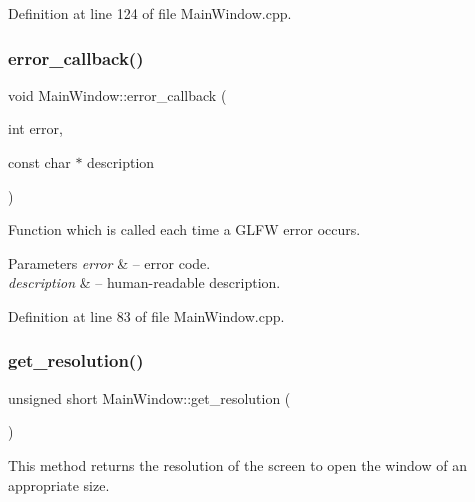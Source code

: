 Definition at line 124 of file Main\+Window.\+cpp.

\mbox{\label{class_main_window_a33c07a10c43688414df5cbf157f58a18}} 
\subsubsection{\texorpdfstring{error\+\_\+callback()}{error\_callback()}}
{\footnotesize\ttfamily void Main\+Window\+::error\+\_\+callback (\begin{DoxyParamCaption}\item[{int}]{error,  }\item[{const char $\ast$}]{description }\end{DoxyParamCaption})\hspace{0.3cm}{\ttfamily [static]}}



Function which is called each time a G\+L\+FW error occurs. 


\begin{DoxyParams}{Parameters}
{\em error} & -- error code. \\
\hline
{\em description} & -- human-\/readable description. \\
\hline
\end{DoxyParams}


Definition at line 83 of file Main\+Window.\+cpp.

\mbox{\label{class_main_window_afb697f0b20242dc01f9c8779382ae53b}} 
\subsubsection{\texorpdfstring{get\+\_\+resolution()}{get\_resolution()}}
{\footnotesize\ttfamily unsigned short Main\+Window\+::get\+\_\+resolution (\begin{DoxyParamCaption}{ }\end{DoxyParamCaption})\hspace{0.3cm}{\ttfamily [protected]}}



This method returns the resolution of the screen to open the window of an appropriate size. 

